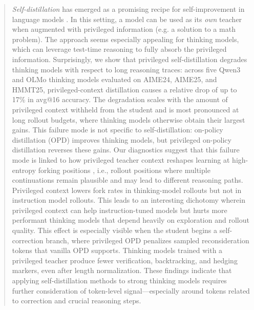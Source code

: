 \begin{abstract}

\emph{Self-distillation} has emerged as a promising recipe for self-improvement in language models \citep{zhao2026selfdistilledreasoneronpolicyselfdistillation,shenfeld2026self,hubotter2026reinforcement}.
In this setting, a model can be used as its \textit{own} teacher when augmented with privileged information (e.g. a solution to a math problem). The approach seems especially appealing  for thinking models, which can leverage test-time reasoning to fully absorb the privileged information. Surprisingly,
we show that privileged self-distillation degrades thinking models with respect to long reasoning traces: across five Qwen3 and OLMo thinking models evaluated on AIME24, AIME25, and HMMT25, privileged-context distillation causes a relative drop of up to 17\% in avg@16 accuracy.
The degradation scales with the amount of privileged context withheld from the student and is most pronounced at long rollout budgets, where thinking models otherwise obtain their largest gains.
This failure mode is not specific to self-distillation: on-policy distillation (OPD) improves thinking models, but privileged on-policy distillation reverses these gains.
Our diagnostics suggest that this failure mode is linked to
how privileged teacher context reshapes learning at high-entropy forking positions \citep{bigelow2024forking, zhang2026embarrassingly}, i.e., rollout positions where multiple continuations remain plausible and may lead to different reasoning paths.
Privileged context lowers fork rates in thinking-model rollouts but not in instruction model rollouts.
This leads to an interesting dichotomy wherein privileged context can help instruction-tuned models but hurts more performant thinking models that depend heavily on exploration and rollout quality.
This effect is especially visible when the student begins a self-correction branch, where privileged OPD penalizes sampled reconsideration tokens that vanilla OPD supports.
Thinking models trained with a privileged teacher produce fewer verification, backtracking, and hedging markers, even after length normalization.
These findings indicate that applying self-distillation methods to strong thinking models requires further consideration of token-level signal---especially around tokens related to correction and crucial reasoning steps.

\end{abstract}
